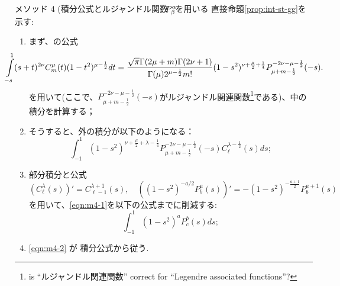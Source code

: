 \documentclass[pdf,notes]{beamer}
\begin{document}
\begin{frame}{メソッド 4 (積分公式とルジャンドル関数$\kern-0.1cm P^\alpha_\beta\kern-0.1cm$を用いる}
	\scriptsize
	直接命題\ref{prop:int-st-gg}を示す:
	\begin{enumerate}
		\item まず、\cite[7.4.11]{kobayashi2011schrodinger}の公式
			{
				\scriptsize
			\begin{equation*}
				\kern-1cm\int_{-s}^1(s+t)^{2\nu} {C}_m^\mu(t)(1-t^2)^{\mu-\frac{1}{2}}dt=
				\frac{\sqrt{\pi}\Gamma(2\mu+m)\Gamma(2\nu+1)}{\Gamma(\mu)2^{\mu-\frac{1}{2}}m!}
				(1-s^2)^{\nu+\frac{\mu}{2}+\frac{1}{4}}P_{\mu+m-\frac{1}{2}}^{-2\nu-\mu-\frac{1}{2}}(-s).
			\end{equation*}
		}
		を用いて(ここで、$P_{\mu+m-\frac{1}{2}}^{-2\nu-\mu-\frac{1}{2}}(-s)$がルジャンドル関連関数\footnote{is ``ルジャンドル関連関数'' correct for ``Legendre associated
		functions''?}である)、中の積分を計算する；
		\item そうすると、外の積分が以下のようになる：
			\begin{equation}\label{eqn:m4-1}
				\int_{-1}^1(1-s^2)^{\nu+\frac{\mu}{2}+\lambda-\frac{1}{4}}P_{\mu+m-\frac{1}{2}}^{-2\nu-\mu-\frac{1}{2}}(-s)C^{\lambda-\frac{1}{2}}_\ell(s)ds;
			\end{equation}
			\vspace{-0.4cm}
		\item 部分積分と公式
			\begin{equation*}
				\left(C^\lambda_\ell(s)  \right)'=C^{\lambda+1}_{\ell-1}(s),\quad\left((1-s^2)^{-a/2}P^a_b(s) \right)'
			=-(1-s^2)^{-\frac{a+1}{2}}P_b^{a+1}(s)
			\end{equation*}
			を用いて、\eqref{eqn:m4-1}を以下の公式までに削減する:
			\begin{equation}\label{eqn:m4-2}
				\int_{-1}^1(1-s^2)^aP^b_c(s)ds;
			\end{equation}
			\vspace{-0.4cm}
		\item \eqref{eqn:m4-2} が \cite[L2]{kobayashi2011schrodinger}積分公式から従う.
	\end{enumerate}
\end{frame}
\end{document}
